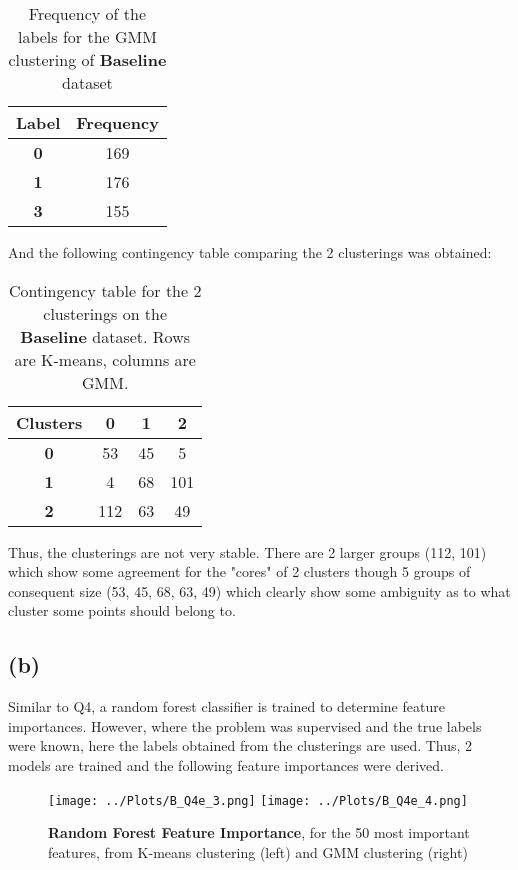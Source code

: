 \documentclass[12pt]{report} %
\begin{document}
\begin{table}[h]
    \centering
    \begin{tabular}{ |c|c| }
        \hline
        \textbf{Label} & \textbf{Frequency} \\
        \hline
        \textbf{0} & 169 \\ 
        \hline
        \textbf{1} & 176 \\
        \hline
        \textbf{3} & 155 \\
        \hline
    \end{tabular}
    \caption{Frequency of the labels for the GMM clustering of \textbf{Baseline} dataset}
\end{table}

And the following contingency table comparing the 2 clusterings was obtained:

\begin{table}[h]
    \centering
    \begin{tabular}{ |c|c|c|c| }
        \hline
        \textbf{Clusters} & \textbf{0} & \textbf{1} & \textbf{2}\\ 
        \hline
        \textbf{0} & 53 & 45 & 5\\
        \hline
        \textbf{1} & 4 & 68 & 101\\
        \hline
        \textbf{2} & 112 & 63 & 49\\
        \hline
    \end{tabular}
    \caption{Contingency table for the 2 clusterings on the \textbf{Baseline} dataset. Rows are K-means, columns are GMM.}
\end{table}

Thus, the clusterings are not very stable. There are 2 larger groups (112, 101) which show some agreement for the "cores" of 2 clusters though 5 groups of consequent size (53, 45, 68, 63, 49) which clearly show some ambiguity as to what cluster some points should belong to. 

\subsection*{(b)}

Similar to Q4, a random forest classifier is trained to determine feature importances. However, where the problem was supervised and the true labels were known, here the labels obtained from the clusterings are used. Thus, 2 models are trained and the following feature importances were derived.

\begin{figure}[htbp]
    \centering
    \texttt{[image: ../Plots/B\_Q4e\_3.png]}
    \texttt{[image: ../Plots/B\_Q4e\_4.png]}
    \caption{\textbf{Random Forest Feature Importance}, for the 50 most important features, from K-means clustering (left) and GMM clustering (right)}
\end{figure}
\end{document}

